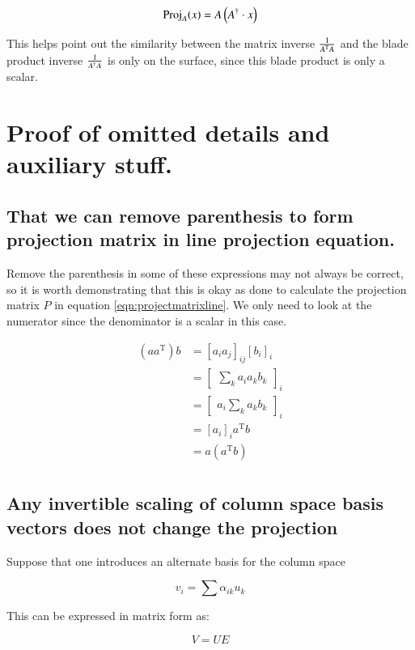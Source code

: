 \documentclass{article}      %
\newcommand{\T}[0]{\text{T}}
\begin{document}
\[
\operatorname{Proj}_A(x) = A \left(A^\dagger \cdot x\right)
\]

This helps point out the similarity between the matrix inverse $\inv{A^\T A}$ and the blade product inverse $\frac{1}{{A^\dagger}A}$ is only on the surface,
since this blade product is only a scalar.

\section{ Proof of omitted details and auxiliary stuff. }

\subsection{ That we can remove parenthesis to form projection matrix in line projection equation. }

Remove the parenthesis in some of these expressions may not always be correct, so it is worth demonstrating that this is okay as
done to calculate the projection matrix $P$ in 
equation \ref{eqn:projectmatrixline}.
We only need to look at the numerator since the denominator is a scalar in this case.

\begin{align*}
(a a^\T) b
&= [ a_i a_j ]_{ij} [b_i]_i \\
&= 
{\begin{bmatrix}
\sum_k a_i a_k b_k
\end{bmatrix}
}_i \\
&= 
{\begin{bmatrix}
a_i \sum_k a_k b_k
\end{bmatrix}
}_i \\
&= [ a_i ]_i a^\T b \\
&= a (a^\T b) \\
\end{align*}



\subsection{ Any invertible scaling of column space basis vectors does not change the projection }


Suppose that one introduces an alternate basis for the column space


\[
v_i = \sum \alpha_{ik} u_k
\]

This can be expressed in matrix form as:

\[
V = U E
\]
\end{document}
